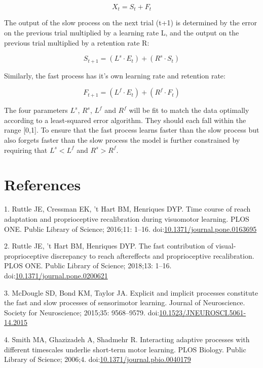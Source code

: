 \documentclass[]{article}
\begin{document}
\begin{equation}
\label{tworate-total}
X_t = S_t + F_t
\end{equation}

The output of the slow process on the next trial (t+1) is determined by
the error on the previous trial multiplied by a learning rate L, and the
output on the previous trial multiplied by a retention rate R:

\begin{equation}
\label{tworate-slow}
S_{t+1} = (L^s \cdot E_t) + (R^s \cdot S_t)
\end{equation}

Similarly, the fast process has it's own learning rate and retention
rate:

\begin{equation}
\label{tworate-fast}
F_{t+1} = (L^f \cdot E_t) + (R^f \cdot F_t)
\end{equation}

The four parameters \(L^s\), \(R^s\), \(L^f\) and \(R^f\) will be fit to
match the data optimally according to a least-squared error algorithm.
They should each fall within the range {[}0,1{]}. To ensure that the
fast process learns faster than the slow process but also forgets faster
than the slow process the model is further constrained by requiring that
\(L^s < L^f\) and \(R^s > R^f\).

\section*{References}\label{references}

\hypertarget{refs}{}
\hypertarget{ref-Ruttle2016}{}
1. Ruttle JE, Cressman EK, 't Hart BM, Henriques DYP. Time course of
reach adaptation and proprioceptive recalibration during visuomotor
learning. PLOS ONE. Public Library of Science; 2016;11: 1--16.
doi:\href{https://doi.org/10.1371/journal.pone.0163695}{10.1371/journal.pone.0163695}

\hypertarget{ref-Ruttle2018}{}
2. Ruttle JE, 't Hart BM, Henriques DYP. The fast contribution of
visual-proprioceptive discrepancy to reach aftereffects and
proprioceptive recalibration. PLOS ONE. Public Library of Science;
2018;13: 1--16.
doi:\href{https://doi.org/10.1371/journal.pone.0200621}{10.1371/journal.pone.0200621}

\hypertarget{ref-McDougle2015}{}
3. McDougle SD, Bond KM, Taylor JA. Explicit and implicit processes
constitute the fast and slow processes of sensorimotor learning. Journal
of Neuroscience. Society for Neuroscience; 2015;35: 9568--9579.
doi:\href{https://doi.org/10.1523/JNEUROSCI.5061-14.2015}{10.1523/JNEUROSCI.5061-14.2015}

\hypertarget{ref-Smith2006}{}
4. Smith MA, Ghazizadeh A, Shadmehr R. Interacting adaptive processes
with different timescales underlie short-term motor learning. PLOS
Biology. Public Library of Science; 2006;4.
doi:\href{https://doi.org/10.1371/journal.pbio.0040179}{10.1371/journal.pbio.0040179}
\end{document}
